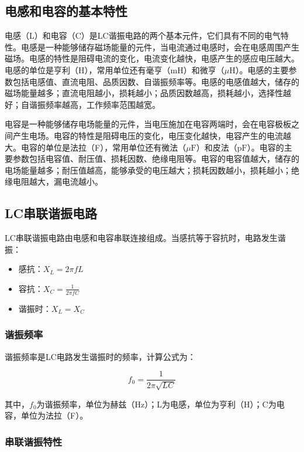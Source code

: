 \documentclass[12pt,UTF8]{ctexbook}
\begin{document}
\subsection{电感和电容的基本特性}

电感（L）和电容（C）是LC谐振电路的两个基本元件，它们具有不同的电气特性。电感是一种能够储存磁场能量的元件，当电流通过电感时，会在电感周围产生磁场。电感的特性是阻碍电流的变化，电流变化越快，电感产生的感应电压越大。电感的单位是亨利（H），常用单位还有毫亨（$\text{mH}$）和微亨（$\mu\text{H}$）。电感的主要参数包括电感值、直流电阻、品质因数、自谐振频率等。电感的电感值越大，储存的磁场能量越多；直流电阻越小，损耗越小；品质因数越高，损耗越小，选择性越好；自谐振频率越高，工作频率范围越宽。

电容是一种能够储存电场能量的元件，当电压施加在电容两端时，会在电容极板之间产生电场。电容的特性是阻碍电压的变化，电压变化越快，电容产生的电流越大。电容的单位是法拉（F），常用单位还有微法（$\mu\text{F}$）和皮法（$\text{pF}$）。电容的主要参数包括电容值、耐压值、损耗因数、绝缘电阻等。电容的电容值越大，储存的电场能量越多；耐压值越高，能够承受的电压越大；损耗因数越小，损耗越小；绝缘电阻越大，漏电流越小。

\subsection{LC串联谐振电路}

LC串联谐振电路由电感和电容串联连接组成。当感抗等于容抗时，电路发生谐振：

\begin{itemize}[leftmargin=3.5em]
    \item 感抗：$X_L = 2\pi f L$
    \item 容抗：$X_C = \frac{1}{2\pi f C}$
    \item 谐振时：$X_L = X_C$
\end{itemize}

\subsubsection{谐振频率}

谐振频率是LC电路发生谐振时的频率，计算公式为：

\[ f_0 = \frac{1}{2\pi \sqrt{LC}} \]

其中，$f_0$为谐振频率，单位为赫兹（Hz）；L为电感，单位为亨利（H）；C为电容，单位为法拉（F）。

\subsubsection{串联谐振特性}
\end{document}
